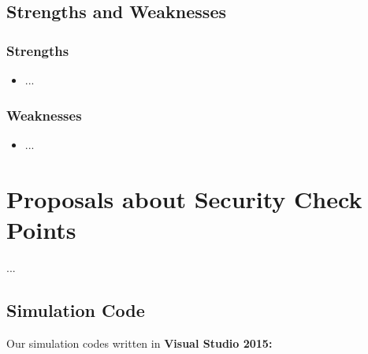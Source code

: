 \documentclass{mcmthesis}
\begin{document}
\subsection{Strengths and Weaknesses}

\subsubsection{Strengths}
	\begin{itemize}
		\item ...
	\end{itemize}
	
\subsubsection{Weaknesses}
	\begin{itemize}
		\item ...
	\end{itemize}

\section{Proposals about Security Check Points}

	...



	
\newpage
	
\begin{appendices}		
	\section{Simulation Code}
			
	Our simulation codes written in \textcolor[rgb]{0.98,0.00,0.00}{\textbf{Visual Studio 2015:}}
	
		
\end{appendices}
\end{document}

